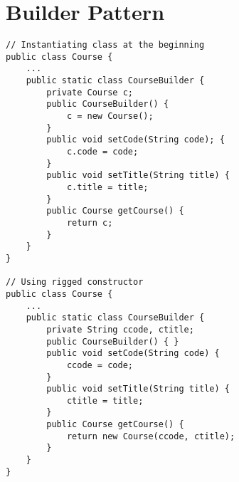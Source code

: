 \clearpage
\section{Builder Pattern}
\begin{lstlisting}
// Instantiating class at the beginning
public class Course {
    ...
    public static class CourseBuilder {
        private Course c;
        public CourseBuilder() {
            c = new Course();
        }
        public void setCode(String code); {
            c.code = code;
        }
        public void setTitle(String title) {
            c.title = title;
        }
        public Course getCourse() {
            return c;
        }
    }
}

// Using rigged constructor
public class Course {
    ...
    public static class CourseBuilder {
        private String ccode, ctitle;
        public CourseBuilder() { }
        public void setCode(String code) {
            ccode = code;
        }
        public void setTitle(String title) {
            ctitle = title;
        }
        public Course getCourse() {
            return new Course(ccode, ctitle);
        }
    }
}


\end{lstlisting}